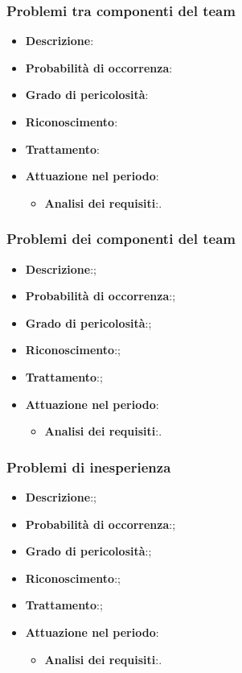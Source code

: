 		\subsubsection{Problemi tra componenti del team}
		\begin{itemize}
			\item \textbf{Descrizione}:
			\item \textbf{Probabilità di occorrenza}:
			\item \textbf{Grado di pericolosità}:
			\item \textbf{Riconoscimento}:	
			\item \textbf{Trattamento}:
			\item \textbf{Attuazione nel periodo}:
			\begin{itemize}
				\item \textbf{Analisi dei requisiti}:.
			\end{itemize}
		\end{itemize}
		
		\subsubsection{Problemi dei componenti del team}
		\begin{itemize}
			\item \textbf{Descrizione}:;
			\item \textbf{Probabilità di occorrenza}:;
			\item \textbf{Grado di pericolosità}:;
			\item \textbf{Riconoscimento}:;
			\item \textbf{Trattamento}:;
			\item \textbf{Attuazione nel periodo}:
			\begin{itemize}
				\item \textbf{Analisi dei requisiti}:.
			\end{itemize}
		\end{itemize}
		
		\subsubsection{Problemi di inesperienza}
		\begin{itemize}
			\item \textbf{Descrizione}:;
			\item \textbf{Probabilità di occorrenza}:;
			\item \textbf{Grado di pericolosità}:;
			\item \textbf{Riconoscimento}:;	
			\item \textbf{Trattamento}:;
			\item \textbf{Attuazione nel periodo}:
			\begin{itemize}
				\item \textbf{Analisi dei requisiti}:.
			\end{itemize}
		\end{itemize}
	
